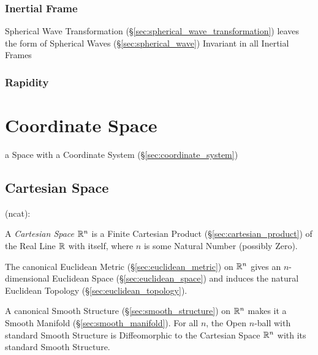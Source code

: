 \subsubsection{Inertial Frame}\label{sec:inertial_frame}

Spherical Wave Transformation (\S\ref{sec:spherical_wave_transformation})
leaves the form of Spherical Waves (\S\ref{sec:spherical_wave}) Invariant in
all Inertial Frames



\subsubsection{Rapidity}\label{sec:rapidity}



\section{Coordinate Space}\label{sec:coordinate_space}

a Space with a Coordinate System (\S\ref{sec:coordinate_system})



\subsection{Cartesian Space}\label{sec:cartesian_space}

(ncat):

A \emph{Cartesian Space} $\mathbb{R}^n$ is a Finite Cartesian Product
(\S\ref{sec:cartesian_product}) of the Real Line $\mathbb{R}$ with itself, where
$n$ is some Natural Number (possibly Zero).

The canonical Euclidean Metric (\S\ref{sec:euclidean_metric}) on $\mathbb{R}^n$
gives an $n$-dimensional Euclidean Space (\S\ref{sec:euclidean_space}) and
induces the natural Euclidean Topology (\S\ref{sec:euclidean_topology}).

A canonical Smooth Structure (\S\ref{sec:smooth_structure}) on $\mathbb{R}^n$ makes
it a Smooth Manifold (\S\ref{sec:smooth_manifold}). For all $n$, the Open
$n$-ball with standard Smooth Structure is Diffeomorphic to the Cartesian Space
$\mathbb{R}^n$ with its standard Smooth Structure.

